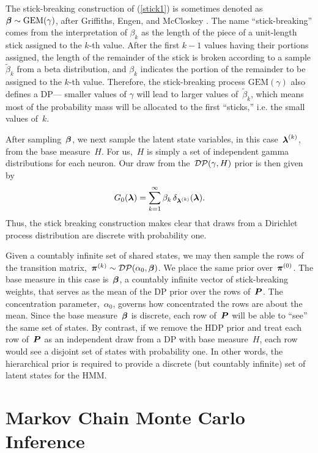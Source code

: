 The stick-breaking construction of (\ref{stick1}) is sometimes denoted
as~${\boldsymbol{\beta} \sim \mathrm{GEM}(\gamma)}$, after Griffiths, Engen, and
McCloskey \citep{Ewens90}.  The name ``stick-breaking'' comes from the
interpretation of $\beta_k$ as the length of the piece of a
unit-length stick assigned to the $k$-th value.  After the first $k-1$
values having their portions assigned, the length of the remainder of
the stick is broken according to a sample $\widetilde{\beta}_k$ from a
beta distribution, and ${\beta}_k$ indicates the portion of the
remainder to be assigned to the $k$-th value. Therefore, the
stick-breaking process $\mathrm{GEM}(\gamma)$ also defines a DP---
smaller values of $\gamma$ will lead to larger values
of~$\widetilde{\beta}_k$, which means most of the probability mass
will be allocated to the first ``sticks,'' i.e. the small values
of~$k$.

After sampling~$\boldsymbol{\beta}$, we next sample the latent state variables, in
this case~${\boldsymbol{\lambda}^{(k)}}$, from the base measure~$H$. For us,~$H$ is 
simply a set of independent gamma distributions for each neuron.
Our draw from
the~${\mathcal{DP}(\gamma,H)}$ prior is then given by
\begin{align*}
G_0(\boldsymbol{\lambda})=\sum_{k=1}^\infty \beta_k \, \delta_{\boldsymbol{\lambda}^{(k)}}(\boldsymbol{\lambda}).
\end{align*}
Thus, the stick breaking construction makes clear that draws from a
Dirichlet process distribution are discrete with probability one.

Given a countably infinite set of shared states, we may then sample
the rows of the transition
matrix,~${\boldsymbol{\pi}^{(k)}\sim\mathcal{DP}(\alpha_0,\boldsymbol{\beta})}$. We place the
same prior over~$\boldsymbol{\pi}^{(0)}$.  The base measure in this case is~$\boldsymbol{\beta}$, a
countably infinite vector of stick-breaking weights, that serves as
the mean of the DP prior over the rows of~$\boldsymbol{P}$. The concentration
parameter,~$\alpha_0$, governs how concentrated the rows are about the
mean. Since the base measure~$\boldsymbol{\beta}$ is discrete, each row of~$\boldsymbol{P}$
will be able to ``see'' the same set of states. By contrast, if we
remove the HDP prior and treat each row of~$\boldsymbol{P}$ as an independent draw
from a DP with base measure~$H$, each row would see a disjoint set of
states with probability one. In other words, the hierarchical prior is
required to provide a discrete (but countably infinite) set of latent
states for the HMM.

\section{Markov Chain Monte Carlo Inference}


